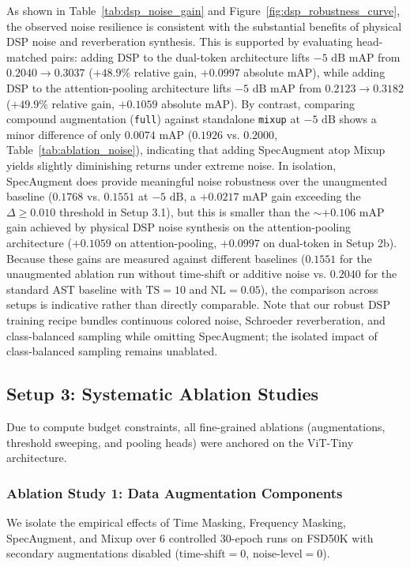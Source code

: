 \documentclass[11pt,a4paper]{article}
\begin{document}
As shown in Table~\ref{tab:dsp_noise_gain} and Figure~\ref{fig:dsp_robustness_curve}, the observed noise resilience is consistent with the substantial benefits of physical DSP noise and reverberation synthesis. This is supported by evaluating head-matched pairs: adding DSP to the dual-token architecture lifts $-5\text{ dB}$ mAP from $0.2040 \to 0.3037$ ($+48.9\%$ relative gain, $+0.0997$ absolute mAP), while adding DSP to the attention-pooling architecture lifts $-5\text{ dB}$ mAP from $0.2123 \to 0.3182$ ($+49.9\%$ relative gain, $+0.1059$ absolute mAP). By contrast, comparing compound augmentation (\texttt{full}) against standalone \texttt{mixup} at $-5\text{ dB}$ shows a minor difference of only $0.0074$ mAP ($0.1926$ vs. $0.2000$, Table~\ref{tab:ablation_noise}), indicating that adding SpecAugment atop Mixup yields slightly diminishing returns under extreme noise. In isolation, SpecAugment does provide meaningful noise robustness over the unaugmented baseline ($0.1768$ vs. $0.1551$ at $-5\text{ dB}$, a $+0.0217$ mAP gain exceeding the $\Delta \ge 0.010$ threshold in Setup 3.1), but this is smaller than the $\sim +0.106$ mAP gain achieved by physical DSP noise synthesis on the attention-pooling architecture ($+0.1059$ on attention-pooling, $+0.0997$ on dual-token in Setup 2b). Because these gains are measured against different baselines ($0.1551$ for the unaugmented ablation run without time-shift or additive noise vs. $0.2040$ for the standard AST baseline with $\text{TS}=10$ and $\text{NL}=0.05$), the comparison across setups is indicative rather than directly comparable. Note that our robust DSP training recipe bundles continuous colored noise, Schroeder reverberation, and class-balanced sampling while omitting SpecAugment; the isolated impact of class-balanced sampling remains unablated. 

\subsection{Setup 3: Systematic Ablation Studies}
Due to compute budget constraints, all fine-grained ablations (augmentations, threshold sweeping, and pooling heads) were anchored on the ViT-Tiny architecture.

\subsubsection{Ablation Study 1: Data Augmentation Components}
We isolate the empirical effects of Time Masking, Frequency Masking, SpecAugment, and Mixup over 6 controlled 30-epoch runs on FSD50K with secondary augmentations disabled ($\text{time-shift}=0$, $\text{noise-level}=0$).
\end{document}

